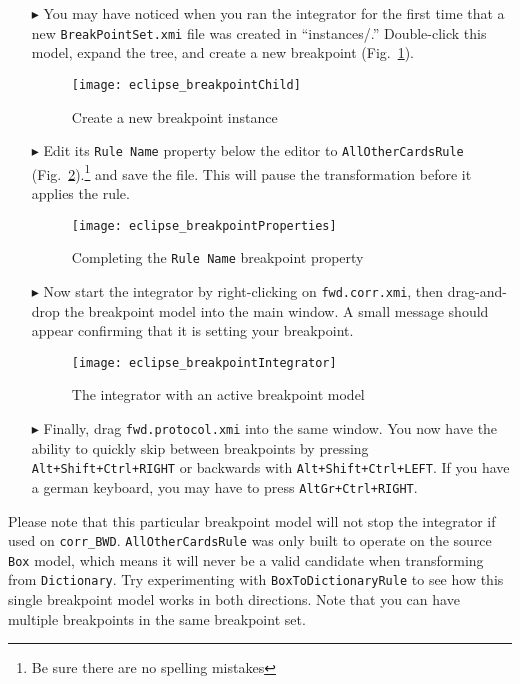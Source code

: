\begin{itemize}

\item[$\blacktriangleright$] You may have noticed when you ran the integrator for the first time that a new \texttt{BreakPointSet.xmi} file was created in
``instances/.'' Dou\-ble-click this model, expand the tree, and create a new breakpoint (Fig.~\ref{eclipse:breakpointChild}).

\begin{figure}[htbp]
\begin{center}
  \texttt{[image: eclipse\_breakpointChild]}
  \caption{Create a new breakpoint instance}
  \label{eclipse:breakpointChild}
\end{center}
\end{figure}

\item[$\blacktriangleright$] Edit its \texttt{Rule Name} property below the editor to \texttt{AllOtherCardsRule} (Fig.~\ref{eclipse:bpProps}).\footnote{Be sure
there are no spelling mistakes} and save the file. This will pause the transformation before it applies the rule.

\begin{figure}[htbp]
\begin{center}
  \texttt{[image: eclipse\_breakpointProperties]}
  \caption{Completing the \texttt{Rule Name} breakpoint property}
  \label{eclipse:bpProps}
\end{center}
\end{figure}

\item[$\blacktriangleright$] Now start the integrator by right-clicking on \texttt{fwd.corr.xmi}, then drag-and-drop the breakpoint model into
the main window. A small message should appear confirming that it is setting your breakpoint. 

\begin{figure}[htbp]
\begin{center}
  \texttt{[image: eclipse\_breakpointIntegrator]}
  \caption{The integrator with an active breakpoint model}
  \label{eclipse:bpIntegrator}
\end{center}
\end{figure}

\item[$\blacktriangleright$] Finally, drag \texttt{fwd.protocol.xmi} into the same window. You now have the ability to quickly skip between breakpoints
by pressing \texttt{Alt\-+Shift\-+Ctrl\-+RIGHT} or backwards with \texttt{Alt\-+Shift\-+Ctrl\-+LEFT}. If you have a german keyboard, you may have to press
\texttt{AltGr+Ctrl+RIGHT}.

\end{itemize}

Please note that this particular breakpoint model will not stop the integrator if used on \texttt{corr\_BWD}. \texttt{AllOtherCardsRule} was only built to
operate on the source \texttt{Box} model, which means it will never be a valid candidate when transforming from \texttt{Dictionary}. Try experimenting with
\texttt{BoxToDictionaryRule} to see how this single breakpoint model works in both directions. Note that you can have multiple breakpoints in the same
breakpoint set.
